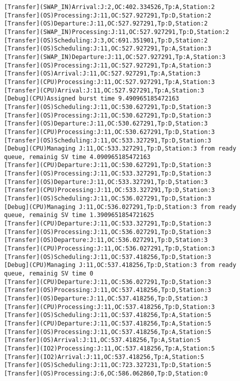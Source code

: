 \documentclass[12pt,a4paper]{article}
\begin{document}
\begin{lstlisting}
[Transfer](SWAP_IN)Arrival:J:2,OC:402.334526,Tp:A,Station:2
[Transfer](OS)Processing:J:11,OC:527.927291,Tp:D,Station:2
[Transfer](OS)Departure:J:11,OC:527.927291,Tp:D,Station:2
[Transfer](SWAP_IN)Processing:J:11,OC:527.927291,Tp:D,Station:2
[Transfer](OS)Scheduling:J:3,OC:691.351901,Tp:D,Station:2
[Transfer](OS)Scheduling:J:11,OC:527.927291,Tp:A,Station:3
[Transfer](SWAP_IN)Departure:J:11,OC:527.927291,Tp:A,Station:3
[Transfer](OS)Processing:J:11,OC:527.927291,Tp:A,Station:3
[Transfer](OS)Arrival:J:11,OC:527.927291,Tp:A,Station:3
[Transfer](CPU)Processing:J:11,OC:527.927291,Tp:A,Station:3
[Transfer](CPU)Arrival:J:11,OC:527.927291,Tp:A,Station:3
[Debug](CPU)Assigned burst time 9.490965185472163
[Transfer](OS)Scheduling:J:11,OC:530.627291,Tp:D,Station:3
[Transfer](OS)Processing:J:11,OC:530.627291,Tp:D,Station:3
[Transfer](OS)Departure:J:11,OC:530.627291,Tp:D,Station:3
[Transfer](CPU)Processing:J:11,OC:530.627291,Tp:D,Station:3
[Transfer](OS)Scheduling:J:11,OC:533.327291,Tp:D,Station:3
[Debug](CPU)Managing J:11,OC:533.327291,Tp:D,Station:3 from ready queue, remainig SV time 4.090965185472163
[Transfer](CPU)Departure:J:11,OC:530.627291,Tp:D,Station:3
[Transfer](OS)Processing:J:11,OC:533.327291,Tp:D,Station:3
[Transfer](OS)Departure:J:11,OC:533.327291,Tp:D,Station:3
[Transfer](CPU)Processing:J:11,OC:533.327291,Tp:D,Station:3
[Transfer](OS)Scheduling:J:11,OC:536.027291,Tp:D,Station:3
[Debug](CPU)Managing J:11,OC:536.027291,Tp:D,Station:3 from ready queue, remainig SV time 1.3909651854721625
[Transfer](CPU)Departure:J:11,OC:533.327291,Tp:D,Station:3
[Transfer](OS)Processing:J:11,OC:536.027291,Tp:D,Station:3
[Transfer](OS)Departure:J:11,OC:536.027291,Tp:D,Station:3
[Transfer](CPU)Processing:J:11,OC:536.027291,Tp:D,Station:3
[Transfer](OS)Scheduling:J:11,OC:537.418256,Tp:D,Station:3
[Debug](CPU)Managing J:11,OC:537.418256,Tp:D,Station:3 from ready queue, remainig SV time 0
[Transfer](CPU)Departure:J:11,OC:536.027291,Tp:D,Station:3
[Transfer](OS)Processing:J:11,OC:537.418256,Tp:D,Station:3
[Transfer](OS)Departure:J:11,OC:537.418256,Tp:D,Station:3
[Transfer](CPU)Processing:J:11,OC:537.418256,Tp:D,Station:3
[Transfer](OS)Scheduling:J:11,OC:537.418256,Tp:A,Station:5
[Transfer](CPU)Departure:J:11,OC:537.418256,Tp:A,Station:5
[Transfer](OS)Processing:J:11,OC:537.418256,Tp:A,Station:5
[Transfer](OS)Arrival:J:11,OC:537.418256,Tp:A,Station:5
[Transfer](IO2)Processing:J:11,OC:537.418256,Tp:A,Station:5
[Transfer](IO2)Arrival:J:11,OC:537.418256,Tp:A,Station:5
[Transfer](OS)Scheduling:J:11,OC:723.327231,Tp:D,Station:5
[Transfer](OS)Processing:J:6,OC:586.062860,Tp:D,Station:0

\end{lstlisting}
\end{document}
